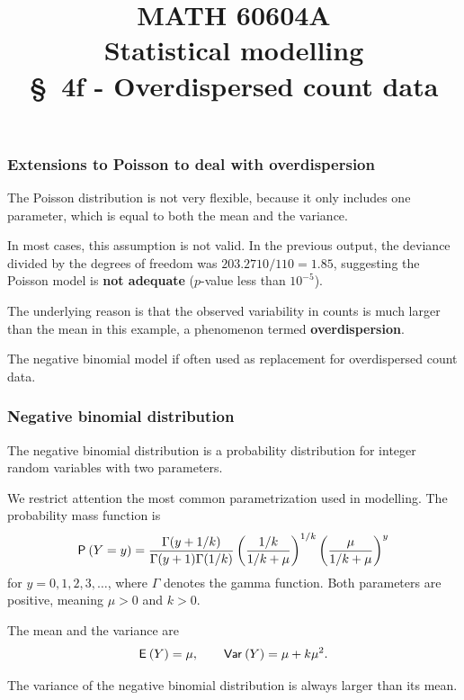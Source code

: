 \documentclass{beamer}
\title[\color{white}{MATH 60604A \S~4f - Overdispersed count data}]{\texorpdfstring{MATH 60604A \\Statistical modelling \\ \S~4f - Overdispersed count data}{MATH 60604A \\Statistical modelling \\ \S~4f - Overdispersed count data}}
\author{}
\institute{HEC Montréal\\
Department of Decision Sciences}
\date{}
\begin{document}
\frame{\titlepage}

\begin{frame}[fragile]
\frametitle{Extensions to Poisson to deal with overdispersion}
\bi
\item The Poisson distribution is not very flexible, because it only includes one parameter, which is equal to both the mean and the variance.
\item In most cases, this assumption is not valid. In the previous output, the deviance divided by the degrees of freedom was $203.2710/110 = 1.85$, suggesting  the Poisson model is \textbf{not adequate} ($p$-value less than $10^{-5}$).
\item The underlying reason is that the observed variability in counts is much larger than the mean in this example, a phenomenon termed \textbf{overdispersion}.
\item The \alert{negative binomial} model if often used as replacement for overdispersed count data.
\ei
\end{frame}


\begin{frame}[fragile]
\frametitle{Negative binomial distribution}
\bi
\item The negative binomial distribution is a probability distribution for \alert{integer} random variables with two parameters.
\item We restrict attention the most common parametrization used in modelling. The probability mass function is
\begin{align*}
\P{Y=y}=\frac{\Gamma(y+1/k)}{\Gamma(y+1)\Gamma(1/k)} \left(\frac{1/k}{1/k + \mu} \right)^{1/k} \left(\frac{\mu}{1/k+\mu}\right)^y
\end{align*}
for $y=0, 1, 2, 3, \ldots$, where $\Gamma$ denotes the gamma function. Both parameters are positive, meaning $\mu>0$ and $k>0$.

\item The mean and the variance are \begin{align*}
\E{Y}=\mu, \qquad \Va{Y}=\mu+k\mu^2.                                 \end{align*}
\item The variance of the negative binomial distribution is always \alert{larger} than its mean. 
\ei
\end{frame}
\end{document}
